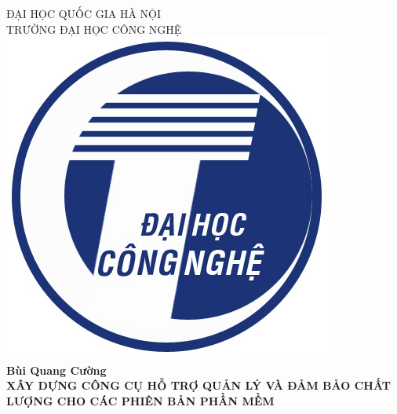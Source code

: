\documentclass[12pt]{article}
\date{}
\begin{document}
	\begin{titlepage}
		\newcommand{\HRule}{\rule{\linewidth}{0.5mm}} %
		
		\center %
		
		
		\textsc{\Large ĐẠI HỌC QUỐC GIA HÀ NỘI\\ TRƯỜNG ĐẠI HỌC CÔNG NGHỆ}\\[1cm] %
		
		
		\includegraphics[width=0.2\linewidth]{images/uet}\\[1cm] %
		
		
		{\Large  \bfseries Bùi Quang Cường}\\[2cm]
		
		
		{ \LARGE \bfseries XÂY DỰNG CÔNG CỤ HỖ TRỢ QUẢN LÝ VÀ ĐẢM BẢO CHẤT LƯỢNG CHO CÁC PHIÊN BẢN PHẦN MỀM}\\[0.5cm] %
		
		\hfill\\[3cm]
		

\end{titlepage}
\end{document}
